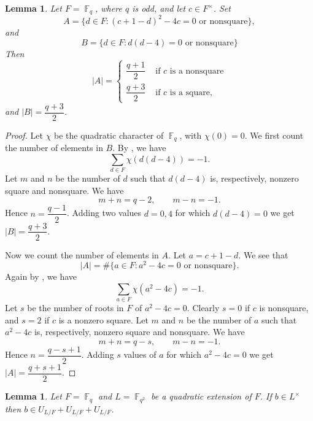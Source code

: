 \documentclass[11pt, a4paper]{amsart}
\newtheorem{lem}[thm]{Lemma}
\theoremstyle{definition}
\DeclareMathOperator{\F}{\mathbb{F}}
\numberwithin{equation}{section}
\begin{document}
\begin{lem}     Let $F=\F_q$, where $q$ is odd, and let $c\in F^\times$. 
Set
\[
A=\{d\in F: (c+1-d)^2-4c=0 \text{ or nonsquare}\},
\]
and 
\[
B=\{d\in F: d(d-4)=0 \text{ or nonsquare}\}
\]
Then \[
|A|=\begin{cases} \dfrac{q+1}{2} & \text{ if $c$ is a nonsquare} \\
\dfrac{q+3}{2} & \text{ if $c$  is a square,}
\end{cases}
\]
and $|B|=\dfrac{q+3}{2}$.    
\end{lem}
\begin{proof}
    Let $\chi$ be the quadratic character of $\F_q$, with $\chi(0)=0$. 
    We first count the number of elements in $B$. By \cite[Theorem 5.48]{LN1997}, we have
    \[
    \sum_{d\in F} \chi( d(d-4))=-1.
    \]
    Let $m$ and $n$  be the number of $d$ such that $d(d-4)$ is, respectively, nonzero square and nonsquare.  We have
    \[ m+n=q-2,\qquad m-n=-1.\]
    Hence $n=\dfrac{q-1}{2}$. Adding two values $d=0,4$ for which $d(d-4)=0$ we get $|B|=\dfrac{q+3}{2}$.


    Now we count the number of elements in $A$.  Let $a=c+1-d$. We see that 
    \[
    |A| =\# \{a\in F: a^2-4c=0 \text{ or nonsquare}\}.
    \]
    Again by \cite[Theorem 5.48]{LN1997}, we have
    \[
       \sum_{a\in F} \chi( a^2-4c)=-1.
    \]
    Let $s$ be the number of roots in $F$ of $a^2-4c=0$. Clearly $s=0$ if $c$ is nonsquare, and $s=2$ if $c$ is a nonzero square. 
     Let $m$ and $n$  be the number of $a$ such that $a^2-4c$ is, respectively, nonzero square and nonsquare.  We have
    \[ m+n=q-s,\qquad m-n=-1.\]
    Hence $n=\dfrac{q-s+1}{2}$. Adding $s$ values of $a$ for which $a^2-4c=0$ we get $|A|=\dfrac{q+s+1}{2}$.
\end{proof}
\begin{lem}
\label{lem:3-sum}
    Let $F=\F_q$ and  $L=\F_{q^2}$ be a quadratic extension of $F$. If $b\in L^\times$ then $b\in U_{L/F}+U_{L/F}+U_{L/F}$.
\end{lem}
\end{document}
